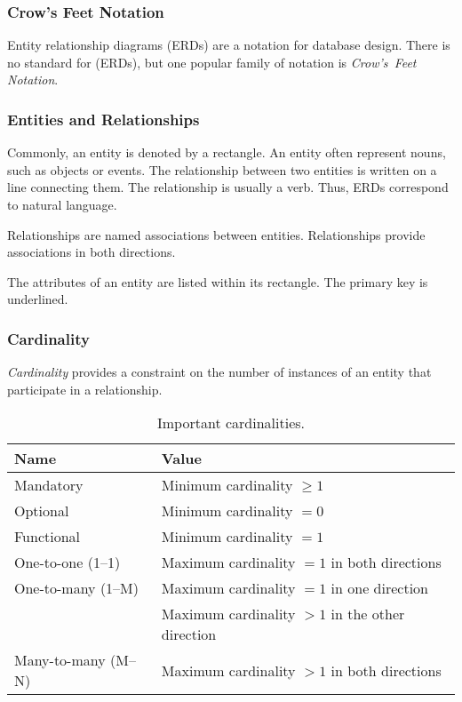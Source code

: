 \subsubsection{Crow's Feet Notation}

Entity relationship diagrams (ERDs) are a notation for database design.
There is no standard for (ERDs), but one popular family of notation is \emph{Crow's~Feet Notation}.

\subsubsection{Entities and Relationships}

Commonly, an entity is denoted by a rectangle.
An entity often represent nouns, such as objects or events.
The relationship between two entities is written on a line connecting them.
The relationship is usually a verb.
Thus, ERDs correspond to natural language.

Relationships are named associations between entities.
Relationships provide associations in both directions.

The attributes of an entity are listed within its rectangle.
The primary key is underlined.

\subsubsection{Cardinality}

\emph{Cardinality} provides a constraint on the number of instances of an entity that participate in a relationship.


\begin{table}[htp]
  \centering
  \caption*{Important cardinalities.}
  \begin{tabular}{ll}
    \toprule
    Name & Value \\
    \midrule
    Mandatory & Minimum cardinality \( \geq 1 \) \\ [1ex]
    Optional & Minimum cardinality \( = 0 \) \\ [1ex]
    Functional & Minimum cardinality \( = 1 \) \\ [1ex]
    \midrule
    One-to-one (1--1) & Maximum cardinality \( = 1 \) in both directions \\ [1ex]
    One-to-many (1--M) & Maximum cardinality \( = 1 \) in one direction \\
    & Maximum cardinality \( > 1 \) in the other direction \\ [1ex]
    Many-to-many (M--N) & Maximum cardinality \( > 1 \) in both directions \\
    \bottomrule
  \end{tabular}
\end{table}

